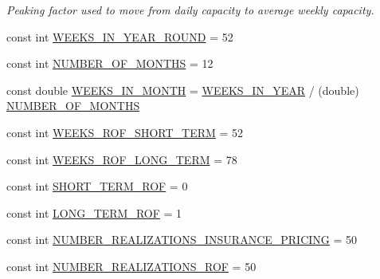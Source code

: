 \begin{DoxyCompactItemize}
\begin{DoxyCompactList}\small\item\em Peaking factor used to move from daily capacity to average weekly capacity. \end{DoxyCompactList}\item 
const int \mbox{\hyperlink{namespaceConstants_aa20160c39be15e5da1535608aaa0647c_aa20160c39be15e5da1535608aaa0647c}{W\+E\+E\+K\+S\+\_\+\+I\+N\+\_\+\+Y\+E\+A\+R\+\_\+\+R\+O\+U\+ND}} = 52
\item 
const int \mbox{\hyperlink{namespaceConstants_aced78823f6427b8251297408fa8e6555_aced78823f6427b8251297408fa8e6555}{N\+U\+M\+B\+E\+R\+\_\+\+O\+F\+\_\+\+M\+O\+N\+T\+HS}} = 12
\item 
const double \mbox{\hyperlink{namespaceConstants_a74ad24a642858cc193c678329422e5ad_a74ad24a642858cc193c678329422e5ad}{W\+E\+E\+K\+S\+\_\+\+I\+N\+\_\+\+M\+O\+N\+TH}} = \mbox{\hyperlink{namespaceConstants_a19e84af3cbc6e1318beb22408c2a1f2f_a19e84af3cbc6e1318beb22408c2a1f2f}{W\+E\+E\+K\+S\+\_\+\+I\+N\+\_\+\+Y\+E\+AR}} / (double) \mbox{\hyperlink{namespaceConstants_aced78823f6427b8251297408fa8e6555_aced78823f6427b8251297408fa8e6555}{N\+U\+M\+B\+E\+R\+\_\+\+O\+F\+\_\+\+M\+O\+N\+T\+HS}}
\item 
const int \mbox{\hyperlink{namespaceConstants_a0317a1ca51d926d052cf05cdc9084c69_a0317a1ca51d926d052cf05cdc9084c69}{W\+E\+E\+K\+S\+\_\+\+R\+O\+F\+\_\+\+S\+H\+O\+R\+T\+\_\+\+T\+E\+RM}} = 52
\item 
const int \mbox{\hyperlink{namespaceConstants_a9c3126b36f6a31b4c94e2a75f99a64c2_a9c3126b36f6a31b4c94e2a75f99a64c2}{W\+E\+E\+K\+S\+\_\+\+R\+O\+F\+\_\+\+L\+O\+N\+G\+\_\+\+T\+E\+RM}} = 78
\item 
const int \mbox{\hyperlink{namespaceConstants_ab10a2c333b2bada353b0eb77cdf98480_ab10a2c333b2bada353b0eb77cdf98480}{S\+H\+O\+R\+T\+\_\+\+T\+E\+R\+M\+\_\+\+R\+OF}} = 0
\item 
const int \mbox{\hyperlink{namespaceConstants_a24006f6443ebe1696dc264eafd778b02_a24006f6443ebe1696dc264eafd778b02}{L\+O\+N\+G\+\_\+\+T\+E\+R\+M\+\_\+\+R\+OF}} = 1
\item 
const int \mbox{\hyperlink{namespaceConstants_a81043bd68881023e5ad54e3bc1e5366f_a81043bd68881023e5ad54e3bc1e5366f}{N\+U\+M\+B\+E\+R\+\_\+\+R\+E\+A\+L\+I\+Z\+A\+T\+I\+O\+N\+S\+\_\+\+I\+N\+S\+U\+R\+A\+N\+C\+E\+\_\+\+P\+R\+I\+C\+I\+NG}} = 50
\item 
const int \mbox{\hyperlink{namespaceConstants_ad6b1922ee031afa4b93176968d060fdf_ad6b1922ee031afa4b93176968d060fdf}{N\+U\+M\+B\+E\+R\+\_\+\+R\+E\+A\+L\+I\+Z\+A\+T\+I\+O\+N\+S\+\_\+\+R\+OF}} = 50

\end{DoxyCompactItemize}
